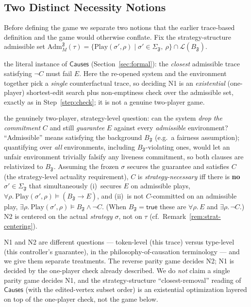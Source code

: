 \documentclass[11pt]{article}
\theoremstyle{remark}
\newcommand{\Lang}{\mathcal{L}}
\newcommand{\True}{\mathsf{true}}
\newcommand{\Frame}{\mathfrak{F}}
\newcommand{\Adm}{\mathrm{Adm}}
\begin{document}
\subsection{Two Distinct Necessity Notions}
\label{sec:two-notions}

Before defining the game we separate two notions that the earlier
trace-based definition and the game would otherwise conflate. Fix the
strategy-structure admissible set
\(\Adm_M^{\Frame}(\tau)=\{\mathrm{Play}(\sigma',\rho)\mid\sigma'\in\Sigma_{\Frame},\
\rho\}\cap\Lang(B_{\Frame})\).
\begin{description}[leftmargin=2.2cm,style=nextline]
  \item[Trace-existential necessity (N1)]
  the literal instance of \(\mathsf{Causes}\) (Section~\ref{sec:formal}): the
  \emph{closest} admissible trace satisfying \(\neg C\) must fail \(E\). Here the
  re-opened system and the environment together pick a \emph{single}
  counterfactual trace, so deciding N1 is an \emph{existential} (one-player)
  shortest-edit search plus non-emptiness check over the admissible set, exactly as in
  Step~\ref{step:check}; it is not a genuine two-player game.
  \item[Strategy-guarantee necessity (N2)]
  the genuinely two-player, strategy-level question: can the system
  \emph{drop the commitment} \(C\) and still \emph{guarantee} \(E\) against every
  \emph{admissible} environment? ``Admissible'' means satisfying the background
  \(B_{\Frame}\) (e.g.\ a fairness assumption); quantifying over \emph{all}
  environments, including \(B_{\Frame}\)-violating ones, would let an unfair
  environment trivially falsify any liveness commitment, so both clauses are
  relativized to \(B_{\Frame}\). Assuming the frozen \(\sigma\) secures the
  guarantee and satisfies \(C\) (the strategy-level actuality requirement), \(C\)
  is \emph{strategy-necessary} iff there is \textbf{no}
  \(\sigma'\in\Sigma_{\Frame}\) that simultaneously
  (i)~secures \(E\) on admissible plays,
  \(\forall\rho.\ \mathrm{Play}(\sigma',\rho)\models(B_{\Frame}\rightarrow E)\),
  and (ii)~is not \(C\)-committed on an admissible play,
  \(\exists\rho.\ \mathrm{Play}(\sigma',\rho)\models B_{\Frame}\wedge\neg C\).
  (When \(B_{\Frame}=\True\) these are \(\forall\rho.\,E\) and
  \(\exists\rho.\,\neg C\).) N2 is centered on the actual \emph{strategy}
  \(\sigma\), not on \(\tau\) (cf.\ Remark~\ref{rem:strat-centering}).
\end{description}
N1 and N2 are different questions --- token-level (this trace) versus type-level
(this controller's guarantee), in the philosophy-of-causation terminology --- and
we give them separate treatments. The reverse parity game decides N2; N1 is
decided by the one-player check already described. We do \emph{not} claim a single
parity game decides N1, and the strategy-structure ``closest-removal'' reading of
\(\mathsf{Causes}\) (with the edited-vertex subset order) is an existential
optimization layered on top of the one-player check, not the game below.
\end{document}
